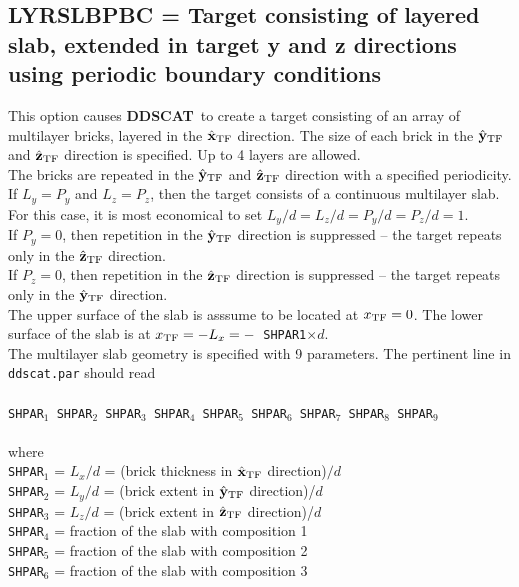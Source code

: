 \subsection{ LYRSLBPBC = Target consisting of layered slab,
                     extended in
                     target y and z directions using
                     periodic boundary conditions}
            \label{sec:LYRSLBPBC}
            This option causes {{\bf DDSCAT}}\ to create a target consisting
	    of an array of multilayer bricks, layered in the $\hat{\bf x}_{\rm TF}$ direction.
	    The size of each brick 
	    in the $\hat{\bf y}_{\rm TF}$ and $\hat{\bf z}_{\rm TF}$ direction is specified.
	    Up to 4 layers are allowed.\\
	    The bricks are repeated in the $\hat{\bf y}_{\rm TF}$ and $\hat{\bf z}_{\rm TF}$ direction
	    with a specified periodicity.
	    If $L_y=P_y$ and $L_z=P_z$, then the target
	    consists of a continuous multilayer slab.  For this case,
	    it is most economical to set $L_y/d=L_z/d=P_y/d=P_z/d=1$.\\
            If $P_y=0$, then repetition in the $\hat{\bf y}_{\rm TF}$ direction is
            suppressed -- the target repeats only in the $\hat{\bf z}_{\rm TF}$ direction.\\
            If $P_z=0$, then repetition in the $\hat{\bf z}_{\rm TF}$ direction is
            suppressed -- the target repeats only in the $\hat{\bf y}_{\rm TF}$ direction.\\
	    The upper surface of the slab is asssume to be located at
	    $x_{\rm TF}=0$.  The lower surface of the slab is at
	    $x_{\rm TF}=-L_x=-$~{\tt SHPAR1}$\times d$.\\
	    The multilayer slab geometry is specified with 9 parameters.
	    The pertinent line in {\tt ddscat.par} should read \\
	    \ \\
	{\tt SHPAR$_1$ SHPAR$_2$ SHPAR$_3$ SHPAR$_4$ SHPAR$_5$ SHPAR$_6$
             SHPAR$_7$ SHPAR$_8$ SHPAR$_9$}\\
	    \ \\
	where\\
	{\tt SHPAR}$_1$ = $L_x/d$ = (brick thickness in $\hat{\bf x}_{\rm TF}$ direction)$/d$\\
	{\tt SHPAR}$_2$ = $L_y/d$ = (brick extent in $\hat{\bf y}_{\rm TF}$ direction)/$d$\\
	{\tt SHPAR}$_3$ = $L_z/d$ = (brick extent in $\hat{\bf z}_{\rm TF}$ direction)/$d$\\
	{\tt SHPAR}$_4$ = fraction of the slab with composition 1\\
	{\tt SHPAR}$_5$ = fraction of the slab with composition 2\\
	{\tt SHPAR}$_6$ = fraction of the slab with composition 3\\
